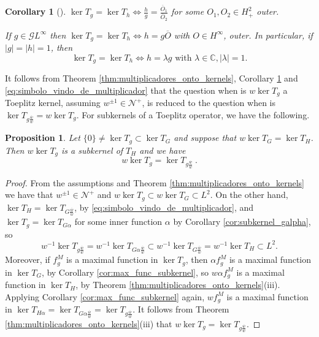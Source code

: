 \documentclass{article}
\numberwithin{equation}{section}
\theoremstyle{plain}
\newtheorem{prop}[thm]{Proposition}
\newtheorem{cor}[thm]{Corollary}
\newcommand{\Hp}{\ensuremath{H^2_+}}
\newcommand{\Linf}{\ensuremath{L^\infty}}
\newcommand{\Hinf}{\ensuremath{H^\infty}}
\newcommand{\CC}{\ensuremath{\mathbb{C}}}
\newcommand{\GG}{\ensuremath{\mathcal{G}}}
\newcommand{\NN}{\ensuremath{\mathcal{N}^+}}
\newcommand{\ol}[1]{\ensuremath{\overline{#1}}}
\newcommand{\zero}{\ensuremath{\{0\}}}
\newcommand{\kertg}{\ensuremath{\ker T_g}}
\newcommand{\kerth}{\ensuremath{\ker T_h}}
\begin{document}
\begin{cor}[{\cite[Corollary 2.19]{CP18_multipliers}}]
\label{cor:kernels_iguais}
$\ker T_g = \ker T_h \iff \frac{h}{g} = \frac{\ol O_1}{\ol O_2}$ for some $O_1,O_2\in\Hp$ outer.

If $g\in\GG\Linf$ then $\ker T_g = \ker T_h \iff h = g \ol{O}$ with $O\in\Hinf$, outer.
In particular, if $|g| = |h| = 1$, then 
\begin{equation}
\kertg = \kerth \iff h = \lambda g \text{ with } \lambda\in\CC, |\lambda| =1.
\end{equation}
\end{cor}


It follows from Theorem \ref{thm:multiplicadores_onto_kernels}, Corollary \ref{cor:kernels_iguais} and \eqref{eq:simbolo_vindo_de_multiplicador} that the question when is $w\kertg$ a Toeplitz kernel, assuming $w^{\pm 1} \in\NN$, is reduced to the question when is $\ker T_{g\frac{\ol w}{w}} = w \kertg$.
For subkernels of a Toeplitz operator, we have the following.


\begin{prop}
\label{prop:multiplier_between_subkernels}
Let $\zero\neq \kertg \subset \ker T_G$ and suppose that $w \ker T_G = \ker T_H$.
Then $w \kertg$ is a subkernel of $T_H$ and we have
\begin{equation}
\label{eq:multiplier_between_subkernels}
w \kertg = \ker T_{g \frac{\ol w}{w}}\ .
\end{equation}
\end{prop}


\begin{proof}
From the assumptions and Theorem \ref{thm:multiplicadores_onto_kernels} we have that $w^{\pm 1} \in\NN$ and $w \kertg \subset w \ker T_G \subset L^2$.
On the other hand, $\ker T_H = \ker T_{G \frac{\ol w}{w}}$, by \eqref{eq:simbolo_vindo_de_multiplicador}, and $\kertg = \ker T_{G\alpha}$ for some inner function $\alpha$ by Corollary \ref{cor:subkernel_galpha}, so
\begin{equation}
w^{-1} \ker T_{g \frac{\ol w}{w}} = w^{-1} \ker T_{G \alpha \frac{\ol w}{w}} \subset w^{-1} \ker T_{G \frac{\ol w}{w}} = w^{-1} \ker T_H \subset L^2.
\end{equation}
Moreover, if $f^M_g$ is a maximal function in \kertg, then $\alpha f^M_g$ is a maximal function in $\ker T_G$, by Corollary \ref{cor:max_func_subkernel}, so $w\alpha f^M_g$ is a maximal function in $\ker T_H$, by Theorem \ref{thm:multiplicadores_onto_kernels}(iii).
Applying Corollary \ref{cor:max_func_subkernel} again, $w f^M_g$ is a maximal function in $\ker T_{H \alpha} = \ker T_{G \alpha \frac{\ol w}{w}} = \ker T_{g \frac{\ol w}{w}}$.
It follows from Theorem \ref{thm:multiplicadores_onto_kernels}(iii) that $w \kertg = \ker T_{g \frac{\ol w}{w}}$.
\end{proof}
\end{document}
